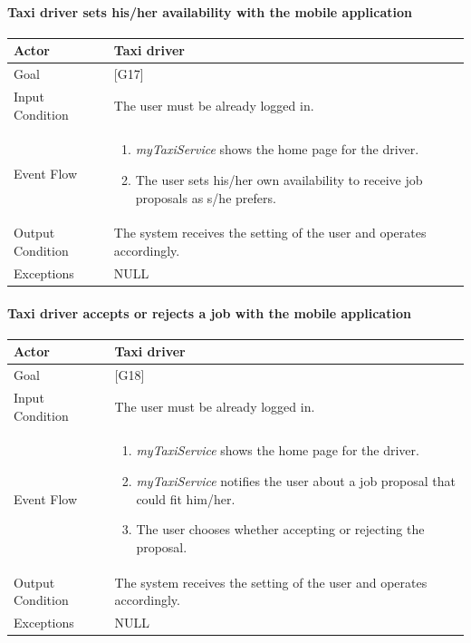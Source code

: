 \documentclass[a4paper,11pt]{report} %
\newcommand{\mts}{\mbox{\normalfont\itshape myTaxiService}}
\begin{document}
	\pagebreak
	
	\paragraph{Taxi driver sets his/her availability with the mobile application}
	\begin{center}
		\begin{tabular}{| l | p{9cm} |}\hline
			Actor & Taxi driver\\\hline
			Goal & {[}G17{]} \\\hline
			Input Condition & The user must be already logged in.\\\hline
			Event Flow & \begin{enumerate}
				\item \mts{} shows the home page for the driver.
				\item The user sets his/her own availability to receive job proposals as s/he prefers.
			\end{enumerate}\\\hline
			Output Condition & The system receives the setting of the user and operates accordingly.\\\hline
			Exceptions & NULL\\\hline
		\end{tabular}
	\end{center}
	
	\pagebreak
	
	\paragraph{Taxi driver accepts or rejects a job with the mobile application}
	\begin{center}
		\begin{tabular}{| l | p{9cm} |}\hline
			Actor & Taxi driver\\\hline
			Goal & {[}G18{]} \\\hline
			Input Condition & The user must be already logged in.\\\hline
			Event Flow & \begin{enumerate}
				\item \mts{} shows the home page for the driver.
				\item \mts{} notifies the user about a job proposal that could fit him/her.	
				\item The user chooses whether accepting or rejecting the proposal.
			\end{enumerate}\\\hline
			Output Condition & The system receives the setting of the user and operates accordingly.\\\hline
			Exceptions & NULL\\\hline
		\end{tabular}
	\end{center}
	
\end{document}
